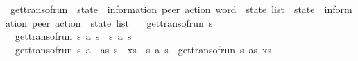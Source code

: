 \begin{isabellebody}
\isanewline
{}\isamarkupfalse%
\ get{\isacharunderscore}{\kern0pt}trans{\isacharunderscore}{\kern0pt}of{\isacharunderscore}{\kern0pt}run\ {\isacharcolon}{\kern0pt}{\isacharcolon}{\kern0pt}\ {\isachardoublequoteopen}{\isacharprime}{\kern0pt}state\ {\isasymRightarrow}\ {\isacharparenleft}{\kern0pt}{\isacharprime}{\kern0pt}information{\isacharcomma}{\kern0pt}\ {\isacharprime}{\kern0pt}peer{\isacharparenright}{\kern0pt}\ action\ word\ {\isasymRightarrow}\ {\isacharprime}{\kern0pt}state\ list\ {\isasymRightarrow}\ {\isacharparenleft}{\kern0pt}{\isacharprime}{\kern0pt}state\ {\isasymtimes}\ {\isacharparenleft}{\kern0pt}{\isacharprime}{\kern0pt}information{\isacharcomma}{\kern0pt}\ {\isacharprime}{\kern0pt}peer{\isacharparenright}{\kern0pt}\ action\ {\isasymtimes}\ {\isacharprime}{\kern0pt}state{\isacharparenright}{\kern0pt}\ list{\isachardoublequoteclose}\ \isanewline
\ \ {\isachardoublequoteopen}get{\isacharunderscore}{\kern0pt}trans{\isacharunderscore}{\kern0pt}of{\isacharunderscore}{\kern0pt}run\ s{}\ {\isasymepsilon}\ {\isacharbrackleft}{\kern0pt}{\isacharbrackright}{\kern0pt}\ {\isacharequal}{\kern0pt}\ {\isacharbrackleft}{\kern0pt}{\isacharbrackright}{\kern0pt}{\isachardoublequoteclose}\ {\isacharbar}{\kern0pt}\isanewline
\ \ {\isachardoublequoteopen}get{\isacharunderscore}{\kern0pt}trans{\isacharunderscore}{\kern0pt}of{\isacharunderscore}{\kern0pt}run\ s{}\ {\isacharbrackleft}{\kern0pt}a{\isacharbrackright}{\kern0pt}\ {\isacharbrackleft}{\kern0pt}s{}{\isacharbrackright}{\kern0pt}\ {\isacharequal}{\kern0pt}\ {\isacharbrackleft}{\kern0pt}{\isacharparenleft}{\kern0pt}s{}{\isacharcomma}{\kern0pt}\ a{\isacharcomma}{\kern0pt}\ s{}{\isacharparenright}{\kern0pt}{\isacharbrackright}{\kern0pt}{\isachardoublequoteclose}\ {\isacharbar}{\kern0pt}\isanewline
\ \ {\isachardoublequoteopen}get{\isacharunderscore}{\kern0pt}trans{\isacharunderscore}{\kern0pt}of{\isacharunderscore}{\kern0pt}run\ s{}\ {\isacharparenleft}{\kern0pt}a\ {\isacharhash}{\kern0pt}\ as{\isacharparenright}{\kern0pt}\ {\isacharparenleft}{\kern0pt}s{}\ {\isacharhash}{\kern0pt}\ xs{\isacharparenright}{\kern0pt}\ {\isacharequal}{\kern0pt}\ {\isacharparenleft}{\kern0pt}s{}{\isacharcomma}{\kern0pt}\ a{\isacharcomma}{\kern0pt}\ s{}{\isacharparenright}{\kern0pt}\ {\isacharhash}{\kern0pt}\ get{\isacharunderscore}{\kern0pt}trans{\isacharunderscore}{\kern0pt}of{\isacharunderscore}{\kern0pt}run\ s{}\ as\ xs{\isachardoublequoteclose}%
\isadelimdocument
%
\endisadelimdocument

\end{isabellebody}
